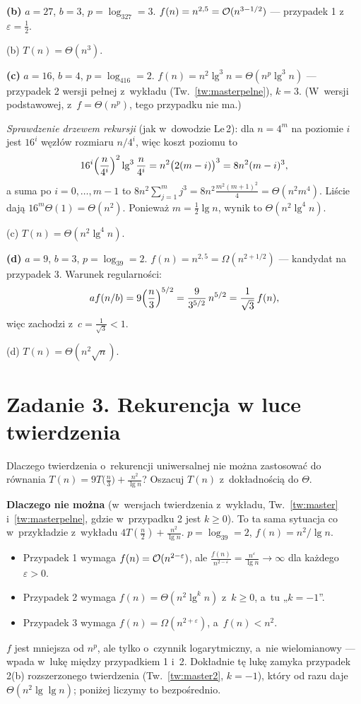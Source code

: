 \documentclass[11pt]{article}
\begin{document}
\textbf{(b)} $a=27$, $b=3$, $p=\log_327=3$. $f(n)=n^{2{,}5}=\O(n^{3-1/2})$ --- przypadek 1 z~$\varepsilon=\frac12$.
\begin{odpowiedz}(b) $T(n)=\Theta(n^3)$.\end{odpowiedz}

\textbf{(c)} $a=16$, $b=4$, $p=\log_416=2$. $f(n)=n^2\lg^3n=\Theta(n^p\lg^3 n)$ ---
przypadek 2 wersji pełnej z~wykładu (Tw.~\ref{tw:masterpelne}), $k=3$.
(W~wersji podstawowej, z~$f=\Theta(n^p)$, tego przypadku nie ma.)

\emph{Sprawdzenie drzewem rekursji} (jak w~dowodzie Le\,2): dla $n=4^m$ na poziomie $i$ jest $16^i$ węzłów rozmiaru $n/4^i$, więc
koszt poziomu to
\[
16^i\Bigl(\frac{n}{4^i}\Bigr)^2\lg^3\frac{n}{4^i} = n^2\bigl(2(m-i)\bigr)^3 = 8n^2(m-i)^3,
\]
a suma po $i=0,\dots,m-1$ to $8n^2\sum_{j=1}^m j^3 = 8n^2\frac{m^2(m+1)^2}{4}=\Theta(n^2m^4)$.
Liście dają $16^m\Theta(1)=\Theta(n^2)$. Ponieważ $m=\frac12\lg n$, wynik to $\Theta(n^2\lg^4n)$.
\begin{odpowiedz}(c) $T(n)=\Theta(n^2\lg^4n)$.\end{odpowiedz}

\textbf{(d)} $a=9$, $b=3$, $p=\log_39=2$. $f(n)=n^{2{,}5}=\Omega(n^{2+1/2})$ --- kandydat na przypadek 3.
Warunek regularności:
\[
a f(n/b) = 9\Bigl(\frac n3\Bigr)^{5/2} = \frac{9}{3^{5/2}}\,n^{5/2} = \frac{1}{\sqrt3}\,f(n),
\]
więc zachodzi z~$c=\frac1{\sqrt3}<1$.
\begin{odpowiedz}(d) $T(n)=\Theta(n^2\sqrt n)$.\end{odpowiedz}

\section{Zadanie 3. Rekurencja w luce twierdzenia}
\begin{tresc}
Dlaczego twierdzenia o~rekurencji uniwersalnej nie można zastosować do równania
$T(n)=9T\bigl(\frac n3\bigr)+\frac{n^2}{\lg n}$? Oszacuj $T(n)$ z~dokładnością do $\Theta$.
\end{tresc}

\textbf{Dlaczego nie można} (w~wersjach twierdzenia z~wykładu,
Tw.~\ref{tw:master} i~\ref{tw:masterpelne}, gdzie w~przypadku 2 jest $k\ge0$).
To ta sama sytuacja co w~przykładzie z~wykładu $4T(\frac n2)+\frac{n^2}{\lg n}$. $p=\log_39=2$, $f(n)=n^2/\lg n$.
\begin{itemize}
\item Przypadek 1 wymaga $f(n)=\O(n^{2-\varepsilon})$, ale
$\frac{f(n)}{n^{2-\varepsilon}}=\frac{n^\varepsilon}{\lg n}\to\infty$ dla każdego $\varepsilon>0$.
\item Przypadek 2 wymaga $f(n)=\Theta(n^2\lg^kn)$ z~$k\ge0$, a~tu „$k=-1$”.
\item Przypadek 3 wymaga $f(n)=\Omega(n^{2+\varepsilon})$, a~$f(n)<n^2$.
\end{itemize}
$f$ jest mniejsza od $n^p$, ale tylko o~czynnik logarytmiczny, a~nie
wielomianowy --- wpada w~lukę między przypadkiem 1 i~2. Dokładnie tę lukę
zamyka przypadek 2(b) rozszerzonego twierdzenia (Tw.~\ref{tw:master2}, $k=-1$), który od razu daje
$\Theta(n^2\lg\lg n)$; poniżej liczymy to bezpośrednio.
\end{document}
